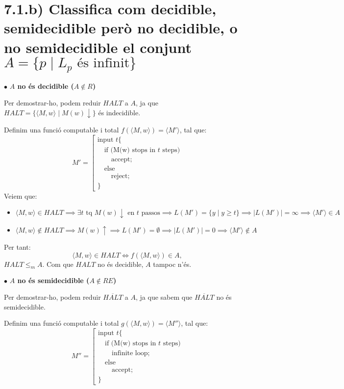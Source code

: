\documentclass{article}
\begin{document}
\section*{\small 7.1.b) Classifica com decidible, semidecidible però no decidible, o no semidecidible el conjunt $ A = \{p \mid L_p \text{ és infinit} \} $}
\vspace{1em}

$\bullet$ \textbf{$A$ no és decidible ($A \notin R$)}

Per demostrar-ho, podem reduir $HALT$ a $A$, ja que $HALT= \{\langle M,w\rangle \mid M(w)\downarrow\}$ és indecidible.

Definim una funció computable i total $f(\langle M,w \rangle) = \langle M'\rangle$, tal que:
\[
M' = \left[
\begin{array}{l}
\text{input } t \{ \\
\quad \text{if (M(w) stops in } t \text{ steps)} \\
\quad\quad \text{accept;} \\
\quad \text{else} \\
\quad\quad \text{reject;} \\
\}
\end{array}
\right.
\]
Veiem que:
\begin{itemize}
    \item $\langle M, w \rangle \in HALT \implies \exists t \text{ tq } M(w) \downarrow \text{ en } t \text{ passos} \implies L(M') = \{y \mid y \ge t\} \implies |L(M')| = \infty \implies \langle M' \rangle \in A$
    \item $ \langle M, w \rangle \notin HALT \implies M(w) \uparrow \implies L(M') = \emptyset \implies |L(M')| = 0 \implies \langle M' \rangle \notin A$
\end{itemize}
Per tant:
$$
\langle M,w\rangle \in HALT \iff f(\langle M,w\rangle) \in A,
$$
$HALT \leq_m A$. Com que $HALT$ no és decidible, $A$ tampoc n'és.

\vspace{1em}
\vspace{1em}

$\bullet$ \textbf{$A$ no és semidecidible ($A \notin RE$)}

Per demostrar-ho, podem reduir $\overline{HALT}$ a $A$, ja que sabem que $\overline{HALT}$ no és semidecidible.

Definim una funció computable i total $g(\langle M,w \rangle) = \langle M''\rangle$, tal que:
\[
M'' = \left[
\begin{array}{l}
\text{input } t \{ \\
\quad \text{if (M(w) stops in } t \text{ steps)} \\
\quad\quad \text{infinite loop;} \\
\quad \text{else} \\
\quad\quad \text{accept;} \\
\}
\end{array}
\right.
\]
\end{document}
